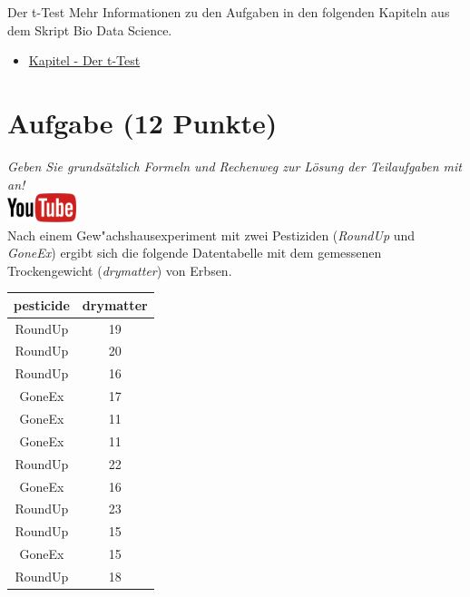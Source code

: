\documentclass[a4paper, 9pt]{scrartcl}\usepackage[]{graphicx}\usepackage[]{xcolor}
\begin{document}
\clearpage
\begin{graybox}{Der t-Test}
Mehr Informationen zu den Aufgaben in den folgenden Kapiteln aus dem Skript Bio Data Science.
  \begin{itemize}
  \item \href{https://jkruppa.github.io/stat-tests-ttest.html}{Kapitel - Der t-Test}
  \end{itemize}
\end{graybox}
\clearpage

\section{Aufgabe \hfill (12 Punkte)}

\textit{Geben Sie grunds{\"a}tzlich Formeln und Rechenweg zur L{\"o}sung der
  Teilaufgaben mit an!} \\[1Ex]

\hfill\href{https://youtu.be/Cq_rF_z4xOk}{\includegraphics[width =
  2cm]{img/youtube}}\\[1Ex]



Nach einem Gew{"a}chshausexperiment mit zwei Pestiziden (\textit{RoundUp} und
\textit{GoneEx}) ergibt sich die folgende Datentabelle mit dem gemessenen
Trockengewicht (\textit{drymatter}) von Erbsen.

\begin{table}[!h]
\centering
\begin{tabular}{cc}
\toprule
pesticide & drymatter\\
\midrule
RoundUp & 19\\
RoundUp & 20\\
RoundUp & 16\\
GoneEx & 17\\
GoneEx & 11\\
\addlinespace
GoneEx & 11\\
RoundUp & 22\\
GoneEx & 16\\
RoundUp & 23\\
RoundUp & 15\\
\addlinespace
GoneEx & 15\\
RoundUp & 18\\
\bottomrule
\end{tabular}
\end{table}
\end{document}
